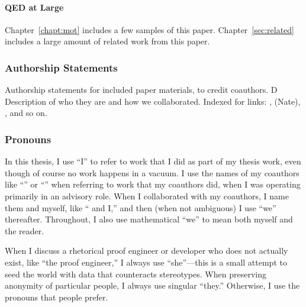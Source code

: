 \paragraph{QED at Large}
Chapter~\ref{chapt:mot} includes a few samples of this paper.
Chapter~\ref{sec:related} includes a large amount of related work from this paper.

\subsubsection*{Authorship Statements}

Authorship statements for included paper materials, to credit coauthors. D
Description of who they are and how we collaborated.
Indexed for links: ,  (Nate),
, and so on.

\subsubsection*{Pronouns}

In this thesis, I use ``I'' to refer to work that I did as part of my thesis work,
even though of course no work happens in a vacuum.
I use the names of my coauthors like ``'' or ``'' when referring to work that my coauthors did,
when I was operating primarily in an advisory role.
When I collaborated with my coauthors, I name them and myself, like `` and I,''
and then (when not ambiguous) I use ``we'' thereafter.
Throughout, I also use mathematical ``we'' to mean both myself and the reader.

When I discuss a rhetorical proof engineer or developer who does not actually exist,
like ``the proof engineer,'' I always use ``she''---this is a small attempt
to seed the world with data that counteracts stereotypes. 
When preserving anonymity of particular people, I always use singular ``they.''
Otherwise, I use the pronouns that people prefer.



